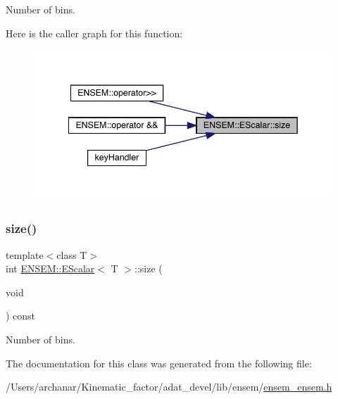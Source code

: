 Number of bins. 

Here is the caller graph for this function\+:
\nopagebreak
\begin{figure}[H]
\begin{center}
\leavevmode
\includegraphics[width=342pt]{d0/d82/classENSEM_1_1EScalar_a314f162d71b15a8eb7e3382a274aa12b_icgraph}
\end{center}
\end{figure}
\mbox{\label{classENSEM_1_1EScalar_a314f162d71b15a8eb7e3382a274aa12b}} 
\subsubsection{\texorpdfstring{size()}{size()}\hspace{0.1cm}{\footnotesize\ttfamily [2/2]}}
{\footnotesize\ttfamily template$<$class T$>$ \\
int \mbox{\hyperlink{classENSEM_1_1EScalar}{E\+N\+S\+E\+M\+::\+E\+Scalar}}$<$ T $>$\+::size (\begin{DoxyParamCaption}\item[{void}]{ }\end{DoxyParamCaption}) const\hspace{0.3cm}{\ttfamily [inline]}}



Number of bins. 



The documentation for this class was generated from the following file\+:\begin{DoxyCompactItemize}
\item 
/\+Users/archanar/\+Kinematic\+\_\+factor/adat\+\_\+devel/lib/ensem/\mbox{\hyperlink{lib_2ensem_2ensem__ensem_8h}{ensem\+\_\+ensem.\+h}}\end{DoxyCompactItemize}

